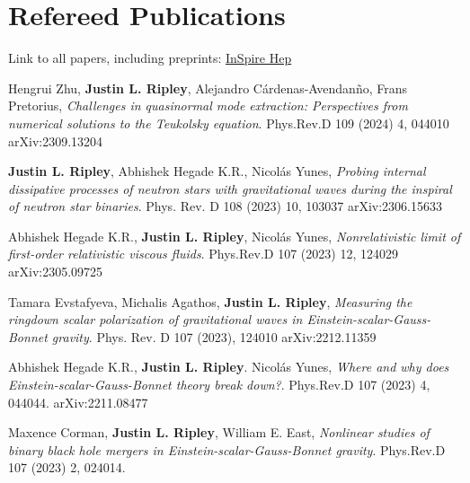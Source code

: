 \documentclass{my_cv}
\begin{document}
\section{Refereed Publications}
Link to all papers, including
preprints: \href{https://inspirehep.net/authors/1477964}{InSpire Hep}
\begin{etaremune}
\item Hengrui Zhu, {\bf Justin L. Ripley}, Alejandro C\'ardenas-Avendan\~no, Frans Pretorius, 
    \emph{Challenges in quasinormal mode extraction: Perspectives from numerical solutions to the Teukolsky equation}.
    Phys.Rev.D 109 (2024) 4, 044010  
    arXiv:2309.13204
\item {\bf Justin L. Ripley}, Abhishek Hegade K.R., Nicol\'{a}s Yunes, 
    \emph{Probing internal dissipative processes of neutron stars with gravitational waves during the inspiral of neutron star binaries}.
    Phys. Rev. D 108 (2023) 10, 103037  
    arXiv:2306.15633
\item Abhishek Hegade K.R., {\bf Justin L. Ripley}, Nicol\'{a}s Yunes, 
    \emph{Nonrelativistic limit of first-order relativistic viscous fluids}.
    Phys.Rev.D 107 (2023) 12, 124029 
    arXiv:2305.09725
\item Tamara Evstafyeva, Michalis Agathos, {\bf Justin L. Ripley}, 
    \emph{Measuring the ringdown scalar polarization of gravitational waves in 
    Einstein-scalar-Gauss-Bonnet gravity}.
    Phys. Rev. D 107 (2023), 124010
    arXiv:2212.11359
\item Abhishek Hegade K.R., {\bf Justin L. Ripley}. Nicol\'{a}s Yunes, 
    \emph{Where and why does Einstein-scalar-Gauss-Bonnet theory break down?}.
    Phys.Rev.D 107 (2023) 4, 044044.
    arXiv:2211.08477
\item Maxence Corman, {\bf Justin L. Ripley}, William E. East, 
   \emph{Nonlinear studies of binary black hole mergers in 
   Einstein-scalar-Gauss-Bonnet gravity}.
   Phys.Rev.D 107 (2023) 2, 024014. 

\end{etaremune}
\end{document}
